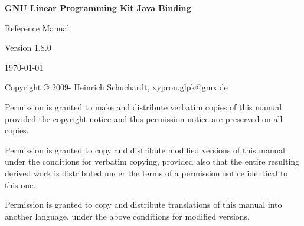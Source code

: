 \documentclass[a4paper,11pt]{report}
\newcommand{\glpkJavaVersion}{1.8.0}
\begin{document}

\thispagestyle{empty}

\begin{center}

\vspace*{1in}

\begin{huge}
\sf\bfseries GNU Linear Programming Kit\linebreak
Java Binding
\end{huge}

\vspace{0.5in}

\begin{LARGE}
\sf Reference Manual
\end{LARGE}

\vspace{0.5in}

\begin{LARGE}
\sf Version \glpkJavaVersion
\end{LARGE}

\vspace{0.5in}
\begin{Large}
\sf \today
\end{Large}
\end{center}

\newpage

\vspace*{1in}

\vfill

\medskip \noindent
Copyright \copyright{} 2009-{\the\year} Heinrich Schuchardt,
xypron.glpk@gmx.de

\medskip \noindent
Permission is granted to make and distribute verbatim copies of this
manual provided the copyright notice and this permission notice are
preserved on all copies.

\medskip \noindent
Permission is granted to copy and distribute modified versions of this
manual under the conditions for verbatim copying, provided also that the
entire resulting derived work is distributed under the terms of
a permission notice identical to this one.

\medskip \noindent
Permission is granted to copy and distribute translations of this manual
into another language, under the above conditions for modified versions.
\end{document}
